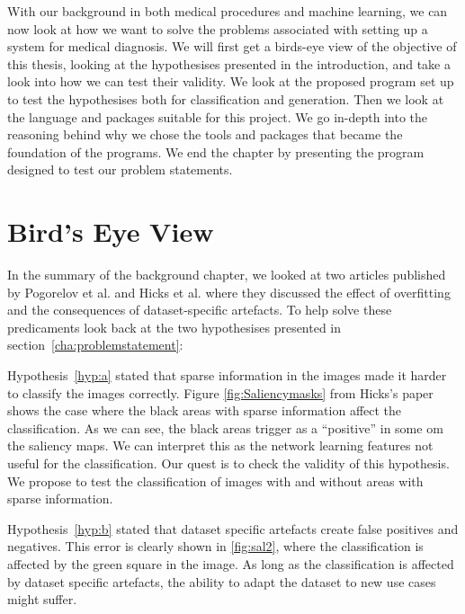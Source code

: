 With our background in both medical procedures and machine learning, we can now look at how we want to solve the problems associated with setting up a system for medical diagnosis.  
We will first get a birds-eye view of the objective of this thesis, looking at the hypothesises presented in the introduction, and take a look into how we can test their validity. We look at the proposed program set up to test the hypothesises both for classification and generation.
Then we look at the language and packages suitable for this project. We go in-depth into the reasoning behind why we chose the tools and packages that became the foundation of the programs. We end the chapter by presenting the program designed to test our problem statements.



\section{Bird's Eye View}
\label{cha:BEW}
In the summary of the background chapter, we looked at two articles published by Pogorelov et al. and Hicks et al. where they discussed the effect of overfitting and the consequences of dataset-specific artefacts.
To help solve these predicaments look back at the two hypothesises presented in section~\ref{cha:problemstatement}:

\vspace{2px}
Hypothesis~\ref{hyp:a} stated that sparse information in the images made it harder to classify the images correctly. Figure \ref{fig:Saliencymasks} from Hicks's paper shows the case where the black areas with sparse information affect the classification. As we can see, the black areas trigger as a ``positive'' in some om the saliency maps. We can interpret this as the network learning features not useful for the classification. 
Our quest is to check the validity of this hypothesis. We propose to test the classification of images with and without areas with sparse information.


\vspace{5px}
Hypothesis~\ref{hyp:b} stated that dataset specific artefacts create false positives and negatives. This error is clearly shown in \ref{fig:sal2}, where the classification is affected by the green square in the image. 
As long as the classification is affected by dataset specific artefacts, the ability to adapt the dataset to new use cases might suffer.  


